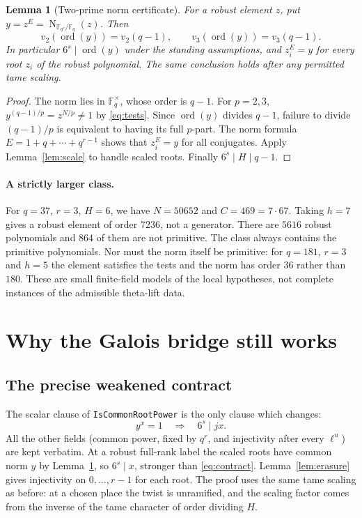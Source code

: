 \documentclass[11pt]{article}
\newtheorem{lemma}[theorem]{Lemma}
\theoremstyle{definition}\newtheorem{definition}[theorem]{Definition}
\newcommand{\F}{\mathbb F}\newcommand{\ord}{\operatorname{ord}}\newcommand{\Nrm}{\operatorname{N}}\newcommand{\vpp}{v_p}
\begin{document}
\begin{lemma}[Two-prime norm certificate]\label{lem:norm}
For a robust element $z$, put $y=z^E=\Nrm_{\F_{q^r}/\F_q}(z)$. Then
\[
 v_2(\ord(y))=v_2(q-1),\qquad v_3(\ord(y))=v_3(q-1).
\]
In particular $6^s\mid\ord(y)$ under the standing assumptions, and $z_i^E=y$ for every root $z_i$ of the robust polynomial. The same conclusion holds after any permitted tame scaling.
\end{lemma}
\begin{proof}
The norm lies in $\F_q^\times$, whose order is $q-1$. For $p=2,3$, $y^{(q-1)/p}=z^{N/p}\ne1$ by \eqref{eq:tests}. Since $\ord(y)$ divides $q-1$, failure to divide $(q-1)/p$ is equivalent to having its full $p$-part. The norm formula $E=1+q+\cdots+q^{r-1}$ shows that $z_i^E=y$ for all conjugates. Apply Lemma~\ref{lem:scale} to handle scaled roots. Finally $6^s\mid H\mid q-1$.
\end{proof}

\paragraph{A strictly larger class.}
For $q=37$, $r=3$, $H=6$, we have $N=50652$ and $C=469=7\cdot67$. Taking $h=7$ gives a robust element of order $7236$, not a generator. There are $5616$ robust polynomials and $864$ of them are not primitive. The class always contains the primitive polynomials. Nor must the norm itself be primitive: for $q=181$, $r=3$ and $h=5$ the element satisfies the tests and the norm has order $36$ rather than $180$. These are small finite-field models of the local hypotheses, not complete instances of the admissible theta-lift data.

\section{Why the Galois bridge still works}
\subsection{The precise weakened contract}
The scalar clause of \texttt{IsCommonRootPower} is the only clause which changes:
\begin{equation}\label{eq:contract}
             y^x=1\quad\Longrightarrow\quad 6^s\mid jx.
\end{equation}
All the other fields (common power, fixed by $q^r$, and injectivity after every $\ell^u$) are kept verbatim. At a robust full-rank label the scaled roots have common norm $y$ by Lemma~\ref{lem:norm}, so $6^s\mid x$, stronger than \eqref{eq:contract}. Lemma~\ref{lem:erasure} gives injectivity on $0,\ldots,r-1$ for each root. The proof uses the same tame scaling as before: at a chosen place the twist is unramified, and the scaling factor comes from the inverse of the tame character of order dividing $H$.
\end{document}
